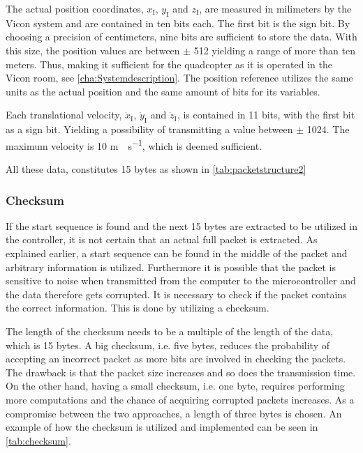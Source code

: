 The actual position coordinates, $x_{\mathrm{I}}$, $y_{\mathrm{I}}$ and $z_{\mathrm{I}}$, are measured in milimeters by the Vicon system and are contained in ten bits each. The first bit is the sign bit. By choosing a precision of centimeters, nine bits are sufficient to store the data. With this size, the position values are between $\pm$ 512 yielding a range of more than ten meters. Thus, making it sufficient for the quadcopter as it is operated in the Vicon room, see \autoref{cha:Systemdescription}. The position reference utilizes the same units as the actual position and the same amount of bits for its variables.

Each translational velocity, $\dot{x}_{\mathrm{I}}$, $\dot{y}_{\mathrm{I}}$ and $\dot{z}_{\mathrm{I}}$, is contained in 11 bits, with the first bit as a sign bit. Yielding a possibility of transmitting a value between $\pm$ 1024. The maximum velocity is 10 \si{m \cdot s^{-1}}, which is deemed sufficient.

All these data, constitutes 15 bytes as shown in \autoref{tab:packetstructure2}

\subsubsection{Checksum}
If the start sequence is found and the next 15 bytes are extracted to be utilized in the controller, it is not certain that an actual full packet is extracted. As explained earlier, a start sequence can be found in the middle of the packet and arbitrary information is utilized. Furthermore it is possible that the packet is sensitive to noise when transmitted from the computer to the microcontroller and the data therefore gets corrupted. It is necessary to check if the packet contains the correct information. This is done by utilizing a checksum. 

The length of the checksum needs to be a multiple of the length of the data, which is 15 bytes. A big checksum, i.e. five bytes, reduces the probability of accepting an incorrect packet as more bits are involved in checking the packets. The drawback is that the packet size increases and so does the transmission time. On the other hand, having a small checksum, i.e. one byte, requires performing more computations and the chance of acquiring corrupted packets increases. As a compromise between the two approaches, a length of three bytes is chosen. An example of how the checksum is utilized and implemented can be seen in \autoref{tab:checksum}.  

